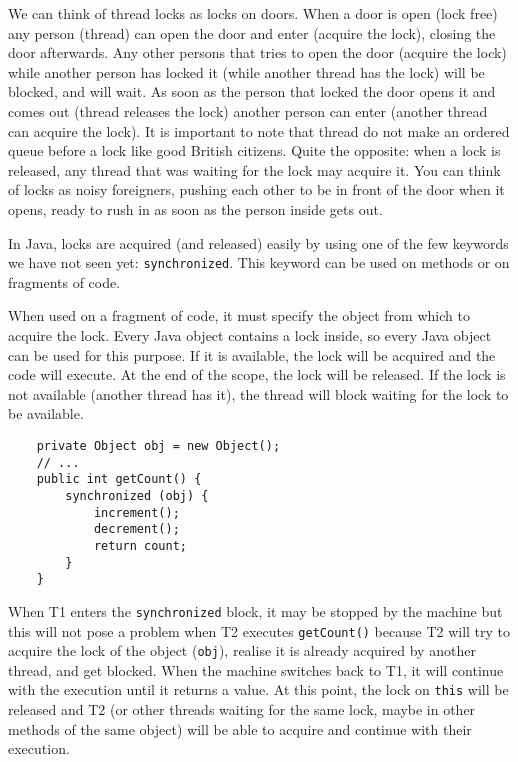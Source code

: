 We can think of thread locks as locks on doors. When a door is open
(lock free) any person (thread) can open the door and enter (acquire
the lock), closing the door afterwards. Any other persons that tries
to open the door (acquire the lock) while another person has locked it
(while another thread has the lock) will be blocked, and will wait. As
soon as the person that locked the door opens it and comes out (thread
releases the lock) another person can enter (another thread can
acquire the lock). It is important to note that thread do not make an
ordered queue before a lock like good British citizens. Quite the
opposite: when a lock is released, any thread that was waiting for the
lock may acquire it. You can think of locks as noisy foreigners,
pushing each other to be in front of the door when it opens, ready to
rush in as soon as the person inside gets out. 

In Java, locks are acquired (and released) easily by using one of the
few keywords we have not seen yet: \verb+synchronized+. This keyword
can be used on methods or on fragments of code. 

When used on a fragment of code, it must specify the object from which
to acquire the lock. 
%
Every Java object contains a lock inside, so every Java object can be
used for this purpose. 
%
If it is available, the lock will be acquired and the code
will execute. At the end of the scope, the lock will be released. If
the lock is not available (another thread has it), the thread will
block waiting for the lock to be available. 

\begin{verbatim}
    private Object obj = new Object();
    // ...
    public int getCount() {
        synchronized (obj) { 
            increment();
            decrement();
            return count;
        }
    }
\end{verbatim}

When T1 enters the \verb+synchronized+ block, it may be stopped by the
machine but this will not pose a problem when T2 executes
\verb+getCount()+ because T2 will try to acquire the lock of the
object (\verb+obj+), realise it is already acquired by another
thread, and get blocked. When the machine switches back to T1, it will
continue with the execution until it returns a value. At this point,
the lock on \verb+this+ will be released and T2 (or other threads
waiting for the same lock, maybe in other methods of the same object)
will be able to acquire and continue with their execution. 

